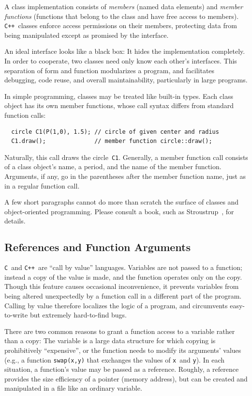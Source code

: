 \documentclass[12pt]{report}
\newcommand{\code}[1]{\texttt{#1}}
\newcommand{\CXX}{\code{C++}}
\begin{document}
A class implementation consists of \emph{members} (named data
elements) and \emph{member functions} (functions that belong to the
class and have free access to members).
\CXX\ classes enforce access permissions on their members, protecting
data from being manipulated except as promised by the interface.

An ideal interface looks like a black box: It hides the implementation
completely.  In order to cooperate, two classes need only know each
other's interfaces. This separation of form and function modularizes a
program, and facilitates debugging, code reuse, and overall
maintainability, particularly in large programs. 

In simple programming, classes may be treated like built-in types.
Each class object has its own member functions, whose call syntax
differs from standard function calls:
\begin{verbatim}
  circle C1(P(1,0), 1.5); // circle of given center and radius
  C1.draw();              // member function circle::draw();
\end{verbatim}
Naturally, this call draws the circle~\code{C1}. Generally, a member
function call consists of a class object's name, a period, and the
name of the member function. Arguments, if any, go in the parentheses
after the member function name, just as in a regular function call.

A few short paragraphs cannot do more than scratch the surface of
classes and object-oriented programming. Please consult a book, such
as Stroustrup~\cite{S}, for details.


\subsection*{References and Function Arguments}

\label{references}
\code{C}~and \CXX\ are ``call by value'' languages. Variables are not
passed to a function; instead a copy of the value is made, and the
function operates only on the copy. Though this feature causes
occasional inconvenience, it prevents variables from being altered
unexpectedly by a function call in a different part of the program.
Calling by value therefore localizes the logic of a program, and
circumvents easy-to-write but extremely hard-to-find bugs.

There are two common reasons to grant a function access to a variable
rather than a copy: The variable is a large data structure for which
copying is prohibitively ``expensive'', or the function needs to
modify its arguments' values (e.g., a function \code{swap(x,y)} that
exchanges the values of \code{x}~and \code{y}). In each situation, a
function's value may be passed as a reference. Roughly, a reference
provides the size efficiency of a pointer (memory address), but can be
created and manipulated in a file like an ordinary variable.
\end{document}
